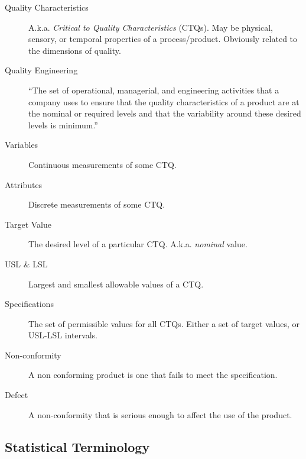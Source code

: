 \begin{description}
\item [Quality Characteristics] A.k.a. \emph{Critical to Quality Characteristics} (CTQs). May be physical, sensory, or temporal properties of a process/product. Obviously related to the dimensions of quality. 

\item [Quality Engineering] ``The set of operational, managerial, and engineering activities
that a company uses to ensure that the quality characteristics of a product are at the nominal
or required levels and that the variability around these desired levels is minimum.'' \citep{montgomery_introduction_2007}
\item [Variables] Continuous measurements of some CTQ.
\item [Attributes] Discrete measurements of some CTQ.
\item [Target Value] The desired level of a particular CTQ. A.k.a. \emph{nominal} value. 
\item [USL \& LSL] Largest and smallest allowable values of a CTQ.
\item [Specifications] The set of permissible values for all CTQs. Either a set of target values, or USL-LSL intervals. 
\item [Non-conformity] A non conforming product is one that fails to meet the specification.
\item [Defect] A non-conformity that is serious enough to affect the use of the product.
\end{description}




\subsection{Statistical Terminology}

